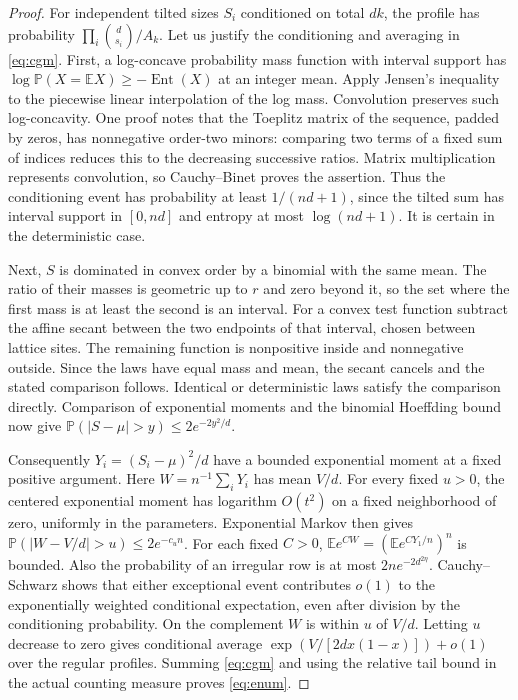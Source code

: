 \documentclass[11pt]{article}
\newcommand{\E}{\mathbb E}
\newcommand{\Prob}{\mathbb P}
\begin{document}
\begin{proof}
For independent tilted sizes $S_i$ conditioned on total $dk$, the
profile has probability $\prod_i\binom d{s_i}/A_k$. Let us justify
the conditioning and averaging in \eqref{eq:cgm}. First, a
log-concave probability mass function with interval support has
$\log\Prob(X=\E X)\ge-\operatorname{Ent}(X)$ at an integer mean.
Apply Jensen's inequality to the piecewise linear interpolation of
the log mass. Convolution preserves such log-concavity. One proof
notes that the Toeplitz matrix of the sequence, padded by zeros,
has nonnegative order-two minors: comparing two terms of a fixed
sum of indices reduces this to the decreasing successive ratios.
Matrix multiplication represents convolution, so Cauchy--Binet
proves the assertion. Thus the conditioning event has probability
at least $1/(nd+1)$, since the tilted sum has interval support in
$[0,nd]$ and entropy at most $\log(nd+1)$. It is certain in the
deterministic case.

Next, $S$ is dominated in convex order by a binomial with the same
mean. The ratio of their masses is geometric up to $r$ and zero
beyond it, so the set where the first mass is at least the second
is an interval. For a convex test function subtract the affine
secant between the two endpoints of that interval, chosen between
lattice sites. The remaining function is nonpositive inside and
nonnegative outside. Since the laws have equal mass and mean,
the secant cancels and the stated comparison follows. Identical
or deterministic laws satisfy the comparison directly.
Comparison of exponential moments and the binomial Hoeffding
bound now give $\Prob(|S-\mu|>y)\le2e^{-2y^2/d}$.

Consequently $Y_i=(S_i-\mu)^2/d$ have a bounded exponential
moment at a fixed positive argument. Here $W=n^{-1}\sum_iY_i$
has mean $V/d$. For every fixed $u>0$, the centered exponential
moment has logarithm $O(t^2)$ on a fixed neighborhood of zero,
uniformly in the parameters. Exponential Markov then gives
$\Prob(|W-V/d|>u)\le 2e^{-c_u n}$. For each fixed $C>0$,
$\E e^{CW}=(\E e^{CY_1/n})^n$ is bounded. Also the probability
of an irregular row is at most $2n e^{-2d^{2\eta}}$.
Cauchy--Schwarz shows that either exceptional event contributes
$o(1)$ to the exponentially weighted conditional expectation,
even after division by the conditioning probability. On the
complement $W$ is within $u$ of $V/d$. Letting $u$ decrease to zero
gives conditional average $\exp(V/[2d x(1-x)])+o(1)$ over the
regular profiles. Summing \eqref{eq:cgm} and using the relative
tail bound in the actual counting measure proves \eqref{eq:enum}.
\end{proof}
\end{document}
